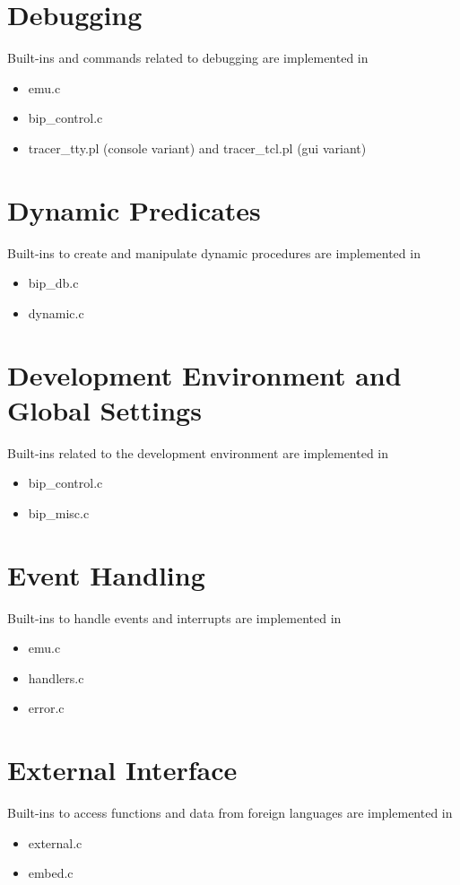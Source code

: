 \section{Debugging }
Built-ins and commands related to debugging are implemented in
     \begin{itemize}
     \item emu.c
     \item bip_control.c
     \item tracer_tty.pl (console variant) and tracer_tcl.pl (gui variant)
     \end{itemize}

\section{Dynamic Predicates }
Built-ins to create and manipulate dynamic procedures are implemented in
     \begin{itemize}
     \item bip_db.c
     \item dynamic.c
     \end{itemize}

\section{Development Environment and Global Settings }
     Built-ins related to the development environment are implemented in
     \begin{itemize}
     \item bip_control.c
     \item bip_misc.c
     \end{itemize}

\section{Event Handling }
     Built-ins to handle events and interrupts are implemented in
     \begin{itemize}
     \item emu.c
     \item handlers.c
     \item error.c
     \end{itemize}

\section{External Interface }
     Built-ins to access functions and data from foreign languages are implemented in
     \begin{itemize}
     \item external.c
     \item embed.c
     \end{itemize}

